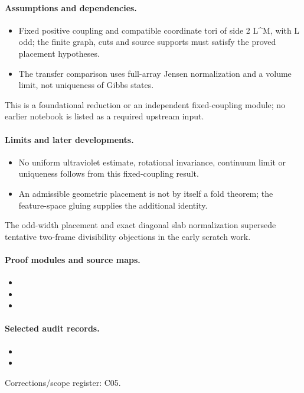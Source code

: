 \paragraph{Assumptions and dependencies.}
\begin{itemize}
\item Fixed positive coupling and compatible coordinate tori of side 2 L\textasciicircum{}M, with L odd; the finite graph, cuts and source supports must satisfy the proved placement hypotheses.
\item The transfer comparison uses full-array Jensen normalization and a volume limit, not uniqueness of Gibbs states.
\end{itemize}

This is a foundational reduction or an independent fixed-coupling module; no earlier notebook is listed as a required upstream input.\par

\paragraph{Limits and later developments.}
\begin{itemize}
\item No uniform ultraviolet estimate, rotational invariance, continuum limit or uniqueness follows from this fixed-coupling result.
\item An admissible geometric placement is not by itself a fold theorem; the feature-space gluing supplies the additional identity.
\end{itemize}

The odd-width placement and exact diagonal slab normalization supersede tentative two-frame divisibility objections in the early scratch work.

\paragraph{Proof modules and source maps.}
\begingroup\small
\begin{itemize}
\item {}
\item {}
\item {}
\end{itemize}
\endgroup

\paragraph{Selected audit records.}
\begingroup\small
\begin{itemize}
\item {}
\item {}
\end{itemize}
\endgroup
Corrections/scope register: C05.\par

